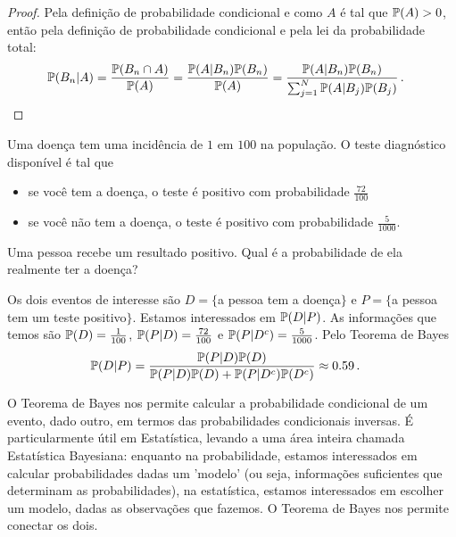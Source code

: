 \begin{proof}
Pela definição de probabilidade condicional e como $A$ é tal que $\mathbb{P}(A)>0$, então pela definição de probabilidade condicional e pela lei da probabilidade total:
\begin{align}
\mathbb{P}(B_n|A) = \frac{\mathbb{P}(B_n \cap A)}{\mathbb{P}(A)} &= \frac{\mathbb{P}(A|B_n)\mathbb{P}(B_n)}{\mathbb{P}(A)}=\frac{\mathbb{P}(A|B_n)\mathbb{P}(B_n)}{\sum_{j=1}^{N}\mathbb{P}(A|B_j)\mathbb{P}(B_j)} \,.
\qedhere
\end{align}
\end{proof}

\begin{example}
Uma doença tem uma incidência de $1$ em $100$ na população. O teste diagnóstico disponível é tal que 
\begin{itemize}[noitemsep]
\item se você tem a doença, o teste é positivo com probabilidade $\frac{72}{100}$
\item se você não tem a doença, o teste é positivo com probabilidade $\frac{5}{1000}$.
\end{itemize}
Uma pessoa recebe um resultado positivo. Qual é a probabilidade de ela realmente ter a doença?

Os dois eventos de interesse são $D=\{$a pessoa tem a doença$\}$ e $P=\{$a pessoa tem um teste positivo$\}$. Estamos interessados em $\mathbb{P}(D|P)$. As informações que temos são $\mathbb{P}(D) = \frac{1}{100}$, $\mathbb{P}(P|D) = \frac{72}{100}$ e $\mathbb{P}(P|D^c) = \frac{5}{1000}$. Pelo Teorema de Bayes
\begin{align}
\mathbb{P}(D|P) &= \frac{\mathbb{P}(P|D)\mathbb{P}(D)}{\mathbb{P}(P|D)\mathbb{P}(D)+\mathbb{P}(P|D^c)\mathbb{P}(D^c)} \approx 0.59 \,.
\end{align}
\end{example}

O Teorema de Bayes nos permite calcular a probabilidade condicional de um evento, dado outro, em termos das probabilidades condicionais inversas. É particularmente útil em Estatística, levando a uma área inteira chamada Estatística Bayesiana: enquanto na probabilidade, estamos interessados em calcular probabilidades dadas um 'modelo' (ou seja, informações suficientes que determinam as probabilidades), na estatística, estamos interessados em escolher um modelo, dadas as observações que fazemos. O Teorema de Bayes nos permite conectar os dois.

